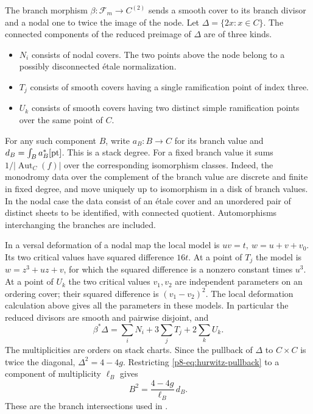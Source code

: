 The branch morphism
\(\beta:\mathcal F_m\to C^{(2)}\) sends a smooth cover to its branch
divisor and a nodal one to twice the image of the node. Let
\(\Delta=\{2x:x\in C\}\). The connected components of the reduced
preimage of \(\Delta\) are of three kinds.
\begin{itemize}
\item \(N_i\) consists of nodal covers. The two points above the node
  belong to a possibly disconnected \'etale normalization.
\item \(T_j\) consists of smooth covers having a single ramification
  point of index three.
\item \(U_k\) consists of smooth covers having two distinct simple
  ramification points over the same point of \(C\).
\end{itemize}
For any such component \(B\), write \(a_B:B\to C\) for its branch
value and \(d_B=\int_B a_B^*[{\rm pt}]\). This is a stack degree.
For a fixed branch value it sums \(1/|\operatorname{Aut}_C(f)|\)
over the corresponding isomorphism classes. Indeed, the monodromy
data over the complement of the branch value are discrete and finite
in fixed degree, and move uniquely up to isomorphism in a disk of
branch values. In the nodal case the data consist of an \'etale cover
and an unordered pair of distinct sheets to be identified, with
connected quotient. Automorphisms interchanging the branches are
included.

In a versal deformation of a nodal map the local model is
\(uv=t,\ w=u+v+v_0\). Its two critical values have squared difference
\(16t\). At a point of \(T_j\) the model is \(w=z^3+uz+v\), for
which the squared difference is a nonzero constant times \(u^3\).
At a point of \(U_k\) the two critical values \(v_1,v_2\) are
independent parameters on an ordering cover; their squared
difference is \((v_1-v_2)^2\). The local deformation calculation
above gives all the parameters in these models. In particular the
reduced divisors are smooth and pairwise disjoint, and
\begin{equation}\label{p8-eq:hurwitz-pullback}
        \beta^*\Delta=\sum_i N_i+3\sum_j T_j+2\sum_k U_k.
\end{equation}
The multiplicities are orders on stack charts. Since the pullback of
\(\Delta\) to \(C\times C\) is twice the diagonal, \(\Delta^2=4-4g\).
Restricting \eqref{p8-eq:hurwitz-pullback} to a component of multiplicity
\(\ell_B\) gives
\begin{equation}\label{p8-eq:hurwitz-intersection}
                         B^2=\frac{4-4g}{\ell_B}\,d_B .
\end{equation}
These are the branch intersections used in \cite[\S4.3]{bp01}.

